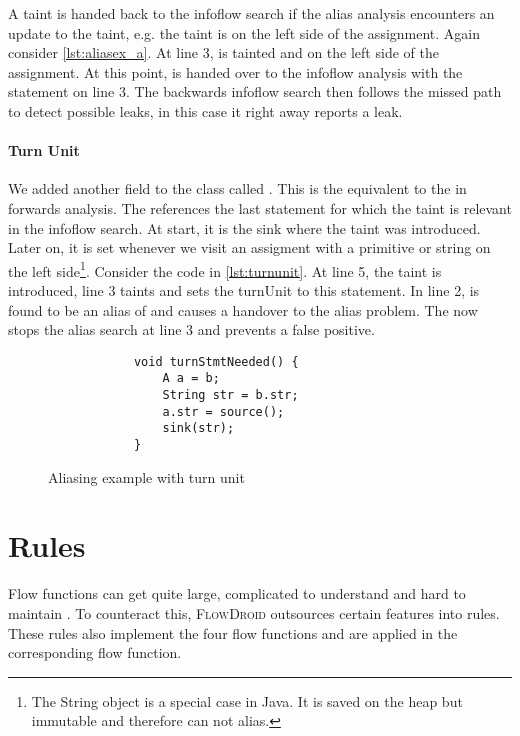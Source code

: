 \documentclass[../draft.tex]{subfiles}
\begin{document}
    A taint is handed back to the infoflow search if the alias analysis encounters an update to the taint, e.g. the taint is on the left side of the assignment. Again consider \autoref{lst:aliasex_a}. At line 3,  is tainted and on the left side of the assignment. At this point,  is handed over to the infoflow analysis with the statement on line 3. The backwards infoflow search then follows the missed path to detect possible leaks, in this case it right away reports a leak.

    \paragraph{Turn Unit} 
    We added another field to the  class called . This is the equivalent to the  in forwards analysis. The  references the last statement for which the taint is relevant in the infoflow search. At start, it is the sink where the taint was introduced. Later on, it is set whenever we visit an assigment with a primitive or string on the left side\footnote{The String object is a special case in Java. It is saved on the heap but immutable and therefore can not alias.}. Consider the code in \autoref{lst:turnunit}. At line 5, the taint is introduced, line 3 taints  and sets the turnUnit to this statement. In line 2,  is found to be an alias of  and causes a handover to the alias problem. The  now stops the alias search at line 3 and prevents a false positive.

    \begin{figure}[ht]
        \centering
        \begin{lstlisting}
            void turnStmtNeeded() {
                A a = b;
                String str = b.str;
                a.str = source();
                sink(str);
            }
        \end{lstlisting}
        \caption{Aliasing example with turn unit}
        \label{lst:turnunit}
    \end{figure}

    \section{Rules}
    Flow functions can get quite large, complicated to understand and hard to maintain \cite{Lerch2015}. To counteract this, \textsc{FlowDroid} outsources certain features into rules. These rules also implement the four flow functions and are applied in the corresponding flow function.
\end{document}
